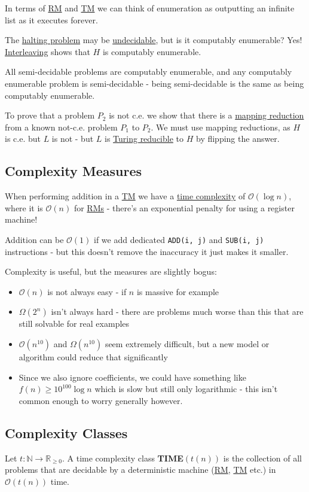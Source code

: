 \documentclass{article}
\begin{document}
In terms of \hyperref[rm]{RM} and \hyperref[tm]{TM} we can think of enumeration as outputting an infinite list as it executes forever.

The \hyperref[halting]{halting problem} may be \hyperref[undecidable]{undecidable}, but is it computably enumerable? Yes! \hyperref[interleaving]{Interleaving} shows that $H$ is computably enumerable.

All semi-decidable problems are computably enumerable, and any computably enumerable problem is semi-decidable - being semi-decidable is the same as being computably enumerable.

To prove that a problem $P_2$ is not c.e. we show that there is a \hyperref[mapping-reduction]{mapping reduction} from a known not-c.e. problem $P_1$ to $P_2$. We must use mapping reductions, as $H$ is c.e. but $L$ is not - but $L$ is \hyperref[turing-reduction]{Turing reducible} to $H$ by flipping the answer.


\subsection{Complexity Measures}
When performing addition in a \hyperref[tm]{TM} we have a \hyperref[time-complexity]{time complexity} of $\mathcal{O}(\log n)$, where it is $\mathcal{O}(n)$ for \hyperref[rm]{RMs} - there's an exponential penalty for using a register machine!

Addition can be $\mathcal{O}(1)$ if we add dedicated \texttt{ADD(i, j)} and \texttt{SUB(i, j)} instructions - but this doesn't remove the inaccuracy it just makes it smaller.

Complexity is useful, but the measures are slightly bogus:
\begin{itemize}
    \item $\mathcal{O}(n)$ is not always easy - if $n$ is massive for example
    \item $\Omega(2^n)$ isn't always hard - there are problems much worse than this that are still solvable for real examples
    \item $\mathcal{O}(n^{10})$ and $\Omega(n^{10})$ seem extremely difficult, but a new model or algorithm could reduce that significantly
    \item Since we also ignore coefficients, we could have something like $f(n) \geq 10^{100} \log n$ which is slow but still only logarithmic - this isn't common enough to worry generally however.
\end{itemize}

\subsection{Complexity Classes}
Let $t:\mathbb{N} \to \mathbb{R}_{\geq 0}$. A time complexity class \textbf{TIME}$(t(n))$ is the collection of all problems that are decidable by a deterministic machine (\hyperref[rm]{RM}, \hyperref[tm]{TM} etc.) in $\mathcal{O}(t(n))$ time.
\end{document}
